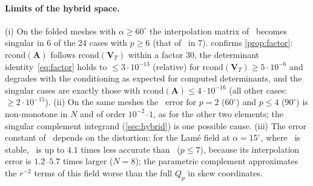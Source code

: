 \paragraph{Limits of the hybrid space.} (i) On the folded meshes with $\alpha\ge60^\circ$ the
interpolation matrix of \PH\ becomes singular in $6$ of the $24$ cases with $p\ge6$ (that of \PM\ in
$7$).  confirms \cref{prop:factor}: $\mathrm{rcond}(\bm A)$ follows
$\mathrm{rcond}(\bm V_T)$ within a factor $30$, the determinant identity~\eqref{eq:factor} holds to
$\le3\cdot10^{-13}$ (relative) for $\mathrm{rcond}(\bm V_T)\ge5\cdot10^{-6}$ and degrades with the
conditioning as expected for computed determinants, and the singular cases are exactly those with
$\mathrm{rcond}(\bm A)\le4\cdot10^{-16}$ (all other cases: $\ge2\cdot10^{-15}$). (ii) On the same meshes the \PH\ error for $p=2$ ($60^\circ$)
and $p\le4$ ($90^\circ$) is non-monotone in $N$ and of order $10^{-2}$--$1$, as for the other two
elements; the singular complement integrand (\cref{sec:hybrid}) is one possible cause. (iii) The
error constant of \PH\ depends on the distortion: for the Lam\'e field at $\alpha=15^\circ$, where \PM\ is
stable, \PH\ is up to $4.1$ times less accurate than \PM\ ($p\le7$), because its interpolation error
is $1.2$--$5.7$ times larger ($N=8$); the parametric complement approximates the $r^{-2}$ terms of this
field worse than the full $Q_p$ in skew coordinates.

\begin{table}[t]
  \centering\small
  \caption{Unisolvence of the hybrid space on the thick-cylinder meshes: minimum over the elements
    of $\mathrm{rcond}$ of $\bm V_T$, of $\bm A$ (\cref{prop:factor}) and of $\bm V$ of
    $Q_p(\hat x,\hat y)$; number of elements with $\mathrm{rcond}(\bm V_T)<\varepsilon$.}
  \label{tab:unisolvence}
  
\end{table}

